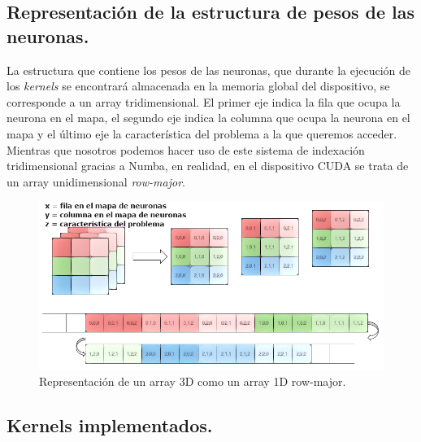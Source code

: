 \subsection{Representación de la estructura de pesos de las neuronas.}
La estructura que contiene los pesos de las neuronas, que durante la ejecución de los \textit{kernels} se encontrará almacenada en la memoria global del dispositivo, se corresponde a un array tridimensional. El primer eje indica la fila que ocupa la neurona en el mapa, el segundo eje indica la columna que ocupa la neurona en el mapa y el último eje la característica del problema a la que queremos acceder.\\

Mientras que nosotros podemos hacer uso de este sistema de indexación tridimensional gracias a Numba, en realidad, en el dispositivo CUDA se trata de un array unidimensional \textit{row-major}.


\begin{figure}[ht]
\centering
\includegraphics[scale=2.0]{imagenes/row-major.png}
\caption{Representación de un array 3D como un array 1D row-major.}
\label{image:rowmajor}
\end{figure}

\subsection{Kernels implementados.}
